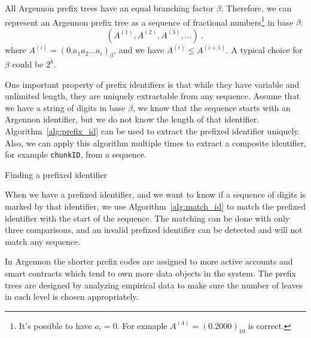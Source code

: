 All Argennon prefix trees have an equal branching factor \(\beta\). Therefore, we can represent an Argennon
prefix tree as a sequence of fractional numbers\footnote{It's possible to have \(a_i=0\). For
exmaple \(A^{(4)}=(0.2000)_{10}\) is correct.} in base \(\beta\):
\[
    (A^{(1)},A^{(2)},A^{(3)},\dots)\ ,
\]
where \(A^{(i)}=(0.a_{1}a_{2}\dots a_{i})_\beta\), and we have \(A^{(i)} \leq A^{(i+1)}\). A typical choice for
\(\beta\) could be \(2^8\).

One important property of prefix identifiers is that while they have variable and unlimited length, they are
uniquely extractable from any sequence. Assume that we have a string of digits in base $\beta$, we
know that the sequence starts with an Argennon identifier, but we do not know the length of that identifier.
Algorithm~\ref{alg:prefix_id} can be used to extract the prefixed identifier uniquely. Also, we can apply this algorithm
multiple times to extract a composite identifier, for example \texttt{chunkID}, from a sequence.

\begin{algorithm}[t]
    \DontPrintSemicolon
    \BlankLine
    \BlankLine
    {
        {
            \;
        }
    }
    \;
    \caption{Finding a prefixed identifier}\label{alg:prefix_id}
\end{algorithm}

When we have a prefixed identifier, and we want to know if a sequence of digits is marked by that identifier,
we use Algorithm~\ref{alg:match_id} to match the prefixed identifier with the start of the sequence. The matching
can be done with only three comparisons, and an invalid prefixed identifier can be detected and will not match
any sequence.

In Argennon the shorter prefix codes are assigned to more active accounts and smart contracts which tend to own more
data objects in the system. The prefix trees are designed by analyzing empirical data to make sure the number
of leaves in each level is chosen appropriately.

